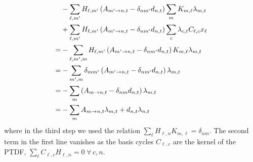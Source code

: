 \documentclass[11pt,twocolumn]{article}
\newcommand{\lmp}[1][n]{\lambda_{#1,t}}
\newcommand{\demand}[1][n]{d_{#1,t}}
\newcommand{\incidence}[1][n]{K_{#1,\ell}}
\newcommand{\ptdf}[1][n]{H_{\ell,#1}}
\newcommand{\cycle}{C_{\ell,c}}
\newcommand{\reactance}{x_\ell}
\newcommand{\cycleprice}{\lambda_{c,t}}
\newcommand{\allocatepeer}[1][m \rightarrow n]{A_{#1,t}}
\begin{document}
\begin{align}
    \notag
      & - \sum_{\ell, m'} \ptdf[m'] \left( \allocatepeer[m' \rightarrow n]  - \delta_{n m'} \demand \right) \sum_m \incidence[m] \lmp[m]          \\
    \notag
      & + \sum_{\ell, m'} \ptdf[m'] \left( \allocatepeer[m' \rightarrow n]  - \delta_{n m'} \demand \right) \sum_c  \cycleprice \cycle \reactance \\
    \notag
    = & - \sum_{\ell, m', m} \ptdf[m'] \left( \allocatepeer[m' \rightarrow n]  - \delta_{n m'} \demand \right) \incidence[m] \lmp[m]              \\
    \notag
    = & - \sum_{m', m} \delta_{m m'} \left( \allocatepeer[m' \rightarrow n]  - \delta_{n m'} \demand \right) \lmp[m]                              \\
    \notag
    = & - \sum_{m} \left( \allocatepeer - \delta_{n m} \demand \right) \lmp[m]                                                                    \\
    = & - \sum_{m} \allocatepeer \lmp[m] + \demand \lmp
\end{align}
where in the third step we used the relation $\sum_\ell \ptdf \incidence[m] = \delta_{n m}$.
The second term in the first line vanishes as the basis cycles $\cycle$ are the kernel of the PTDF, $\sum_{\ell} \cycle \ptdf  = 0 \; \forall\, c, n$.
\end{document}
